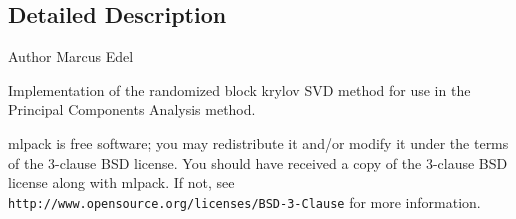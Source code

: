 \subsection{Detailed Description}
\begin{DoxyAuthor}{Author}
Marcus Edel
\end{DoxyAuthor}
Implementation of the randomized block krylov S\+VD method for use in the Principal Components Analysis method.

mlpack is free software; you may redistribute it and/or modify it under the terms of the 3-\/clause B\+SD license. You should have received a copy of the 3-\/clause B\+SD license along with mlpack. If not, see {\tt http\+://www.\+opensource.\+org/licenses/\+B\+S\+D-\/3-\/\+Clause} for more information. 